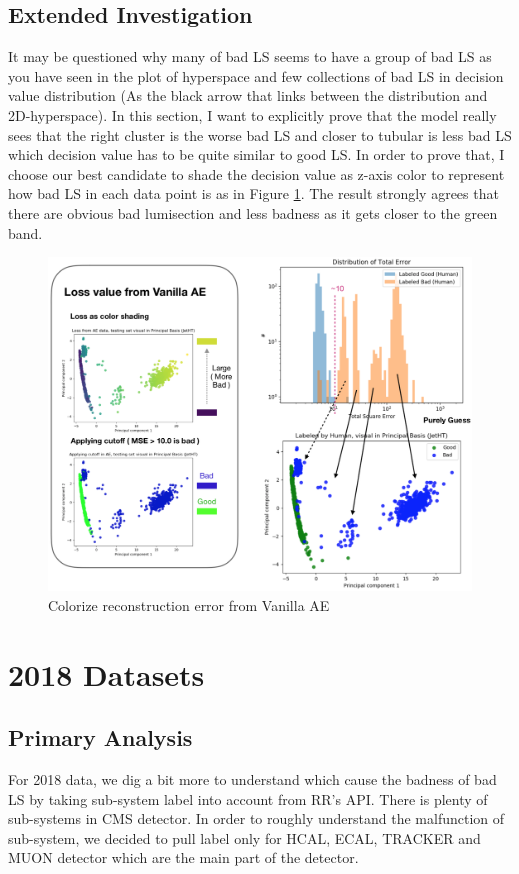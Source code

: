 \subsection{Extended Investigation}
It may be questioned why many of bad LS seems to have a group of bad LS as you have seen in the plot of hyperspace and few collections of bad LS in decision value distribution (As the black arrow that links between the distribution and 2D-hyperspace). In this section, I want to explicitly prove that the model really sees that the right cluster is the worse bad LS and closer to tubular is less bad LS which decision value has to be quite similar to good LS. In order to prove that, I choose our best candidate to shade the decision value as z-axis color to represent how bad LS in each data point is as in Figure \ref{fig:2016_guess_visual}. The result strongly agrees that there are obvious bad lumisection and less badness as it gets closer to the green band.
\begin{figure}[h!]
    \centering
    \includegraphics[width=\textwidth]{images/reco/2016/guess_visual.png}
    \caption{Colorize reconstruction error from Vanilla AE}
    \label{fig:2016_guess_visual}
\end{figure}



\section{2018 Datasets}

\subsection{Primary Analysis}
For 2018 data, we dig a bit more to understand which cause the badness of bad LS by taking sub-system label into account from RR's API. There is plenty of sub-systems in CMS detector. In order to roughly understand the malfunction of sub-system, we decided to pull label only for HCAL, ECAL, TRACKER and MUON detector which are the main part of the detector.

